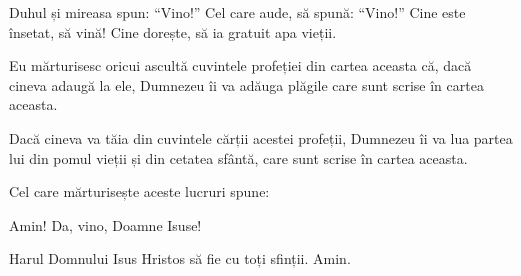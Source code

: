 {



\par }{\PP {}Duhul și mireasa spun: “Vino!” Cel care aude, să spună: “Vino!” Cine este însetat, să vină! Cine dorește, să ia gratuit apa vieții.


\par }{\PP {}Eu mărturisesc oricui ascultă cuvintele profeției din cartea aceasta că, dacă cineva adaugă la ele, Dumnezeu îi va adăuga plăgile care sunt scrise în cartea aceasta.

Dacă cineva va tăia din cuvintele cărții acestei profeții, Dumnezeu îi va lua partea lui din pomul vieții și din cetatea sfântă, care sunt scrise în cartea aceasta.

Cel care mărturisește aceste lucruri spune:
{}

\par }{\PP Amin! Da, vino, Doamne Isuse!


\par }{\PP {}Harul Domnului Isus Hristos să fie cu toți sfinții. Amin.


\par }